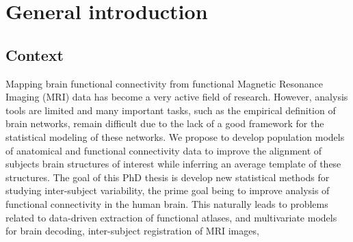\chapter{General introduction}
\label{chap:intro}

\minitoc

\section{Context}
Mapping brain functional connectivity from functional Magnetic Resonance Imaging (MRI) data has become
a very active field of research. However, analysis tools are limited and many important tasks, such as the empirical
definition of brain networks, remain difficult due to the lack of a good framework for the statistical
modeling of these networks. We propose to develop population models of anatomical and functional connectivity
data to improve the alignment of subjects brain structures of interest while inferring an average template
of these structures. %
The goal of this PhD thesis is develop new statistical methods for studying inter-subject variability, the prime goal being to improve analysis of functional connectivity in the human brain. This naturally leads to problems related to data-driven extraction of functional atlases, and
multivariate models for brain decoding, inter-subject registration of MRI images,




